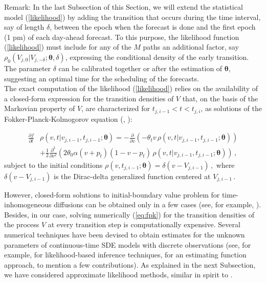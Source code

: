 \documentclass[11pt]{article}
\theoremstyle{definition}
\begin{document}
Remark: In the last Subsection of this Section, we will extend the statistical model (\ref{likelihood}) by adding the transition that occurs during the time interval, say of length $\delta$, between the epoch when the forecast is done and the first epoch (1 pm) of each day-ahead forecast. 
To this purpose, the likelihood function (\ref{likelihood}) must include for any of the $M$ paths an additional factor, say $\rho_0 (V_{j, 0}|V_{j, -\delta};\bm{\theta},\delta)$, expressing the conditional density of the early transition. The parameter $\delta$ can be calibrated together or after the estimation of $\bm{\theta}$, suggesting an optimal time for the scheduling of the forecasts.\\
 
The exact computation of the likelihood (\ref{likelihood}) relies on the availability of a closed-form expression for the transition densities of $V$ that, on the basis of the Markovian property of $V$, are characterized for $ t_{j, i-1} < t < t_{j,i}$,  as solutions of the Fokker-Planck-Kolmogorov equation (\cite[36]{iacus1}, \cite[61-68]{saso}):

\begin{align}
\frac{ \partial f }{\partial t } & \rho(v ,t \vert v_{j,i-1} ,  t_{j,i-1} ; \bm{\theta} )= - \frac{\partial}{ \partial v} (- \theta_t v \, \rho(v ,t \vert v_{j,i-1} ,  t_{j,i-1} ; \bm{\theta} ) ) \nonumber \\
& + \frac{1}{2} \frac{\partial^2}{ \partial v^2} ( 2 \theta_0 \alpha (v+ p_t) (1 - v- p_t) \, \rho(v ,t \vert v_{j,i-1} ,  t_{j,i-1} ; \bm{\theta} ) )\,,  \label{eq:fpk}
\end{align}
subject to the initial conditions $\rho(v , t_{j, i-1} ; \bm{\theta} ) = \delta(v - V_{j, i-1}) \,,$ where $ \delta(v - V_{j, i-1})$ is the Dirac-delta generalized function centered at $ V_{j, i-1}\,.$

However, closed-form solutions to initial-boundary value problem for time-inhomogeneous diffusions can be obtained only in a few cases (see, for example, \autocite[Section 3.1]{eglix}). Besides, in our case, solving numerically (\ref{eq:fpk}) for the transition densities of the process $V$ at every transition step is computationally expensive. 
Several numerical techniques have been devised to obtain estimates for the unknown parameters of continuous-time SDE models with discrete observations (see, for example, \cite{prewo} for likelihood-based inference techniques, \cite{Sor} for an estimating function approach, to mention a few contributions). As explained in the next Subsection, we have considered approximate likelihood methods, similar in spirit to \autocite[Section 11.4]{saso}.
\end{document}
